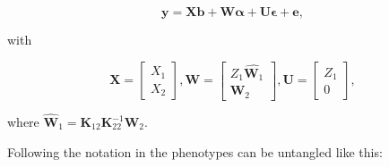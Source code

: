\documentclass[12pt,titlepage]{article}
\begin{document}
\begin{equation} \label{eq:single-step-model}
\mathbf{y} = \mathbf{Xb} + \mathbf{W} \boldsymbol{\alpha} + \mathbf{U} \boldsymbol{\epsilon} + \mathbf{e},
\end{equation}

with

\begin{equation} \label{eq:single-step-submatrices}
\mathbf{X} = 
\begin{bmatrix}
  X_1 \\
  X_2 
 \end{bmatrix},
 \mathbf{W} = 
\begin{bmatrix}
  Z_1\hat{\mathbf{W}_1} \\
  \mathbf{W}_2 
 \end{bmatrix},
 \mathbf{U} = 
\begin{bmatrix}
  Z_1 \\
  0 
 \end{bmatrix},
\end{equation}

where $\hat{\mathbf{W}}_{1} = \mathbf{K}_{12} \mathbf{K}_{22}^{-1} \mathbf{W}_{2}$.

Following the notation in  the phenotypes can be untangled 
like this:
\end{document}
